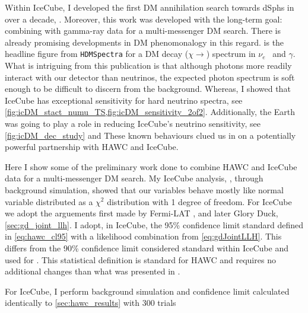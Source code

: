 Within IceCube, I developed the first DM annihilation search towards dSphs in over a decade, .
Moreover, this work was developed with the long-term goal: combining with gamma-ray data for a multi-messenger DM search.
There is already promising developments in DM phenomonalogy in this regard.
 is the headline figure from \texttt{HDMSpectra} \cite{HDMSpectra} for a DM decay ($\chi \rightarrow$) spectrum in $\nu_e$~ and $\gamma$.
What is intriguing from this publication is that although photons more readily interact with our detector than neutrinos, the expected photon spectrum is soft enough to be difficult to discern from the background.
Whereas, I showed that IceCube has exceptional sensitivity for hard neutrino spectra, see \cref{fig:icDM_stact_numu_TS,fig:icDM_sensitivity_2of2}.
Additionally, the Earth was going to play a role in reducing IceCube's neutrino sensitivity, see \cref{fig:icDM_dec_study} and \cite{IC3:Earth_Attenuation}
These known behaviours clued us in on a potentially powerful partnership with HAWC and IceCube.

Here I show some of the preliminary work done to combine HAWC and IceCube data for a multi-messenger DM search.
My IceCube analysis, , through background simulation, showed that our variables behave mostly like normal variable distributed as a $\chi^2$ distribution with 1 degree of freedom.
For IceCube we adopt the arguements first made by Fermi-LAT \cite{FermiLAT:dm1}, and later Glory Duck, \cref{sec:gd_joint_llh}.
I adopt, in IceCube, the 95\% confidence limit standard defined in \cref{eq:hawc_cl95} with a likelihood combination from \cref{eq:gdJointLLH}.
This differs from the 90\% confidence limit considered standard within IceCube and used for .
This statistical definition is standard for HAWC and requires no additional changes than what was presented in .

For IceCube, I perform background simulation and confidence limit calculated identically to \cref{sec:hawc_results} with 300 trials 

